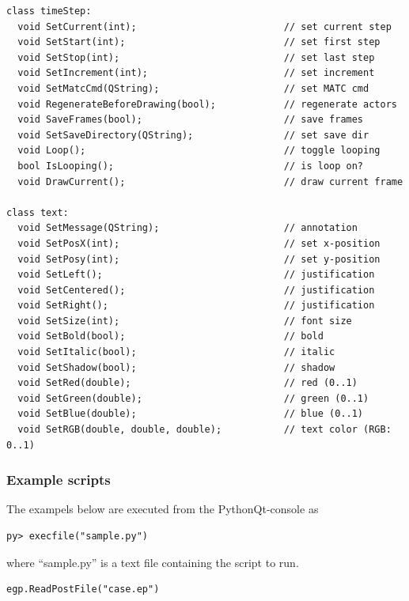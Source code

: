 \documentclass[a4paper,12pt]{article}
\begin{document}
\begin{footnotesize}
\begin{verbatim}
class timeStep:
  void SetCurrent(int);                          // set current step
  void SetStart(int);                            // set first step
  void SetStop(int);                             // set last step
  void SetIncrement(int);                        // set increment
  void SetMatcCmd(QString);                      // set MATC cmd
  void RegenerateBeforeDrawing(bool);            // regenerate actors
  void SaveFrames(bool);                         // save frames
  void SetSaveDirectory(QString);                // set save dir
  void Loop();                                   // toggle looping
  bool IsLooping();                              // is loop on?
  void DrawCurrent();                            // draw current frame

class text:
  void SetMessage(QString);                      // annotation
  void SetPosX(int);                             // set x-position
  void SetPosy(int);                             // set y-position
  void SetLeft();                                // justification
  void SetCentered();                            // justification
  void SetRight();                               // justification
  void SetSize(int);                             // font size
  void SetBold(bool);                            // bold
  void SetItalic(bool);                          // italic
  void SetShadow(bool);                          // shadow
  void SetRed(double);                           // red (0..1)
  void SetGreen(double);                         // green (0..1)
  void SetBlue(double);                          // blue (0..1)
  void SetRGB(double, double, double);           // text color (RGB: 0..1)
\end{verbatim}
\end{footnotesize}

\subsubsection{Example scripts}

The exampels below are executed from the PythonQt-console as
\begin{footnotesize}
\begin{verbatim}
py> execfile("sample.py")
\end{verbatim}
\end{footnotesize}
where ``sample.py'' is a text file containing the script to run.

\vskip5mm
\begin{footnotesize}
\begin{verbatim}
egp.ReadPostFile("case.ep")
\end{verbatim}
\end{footnotesize}
\end{document}
